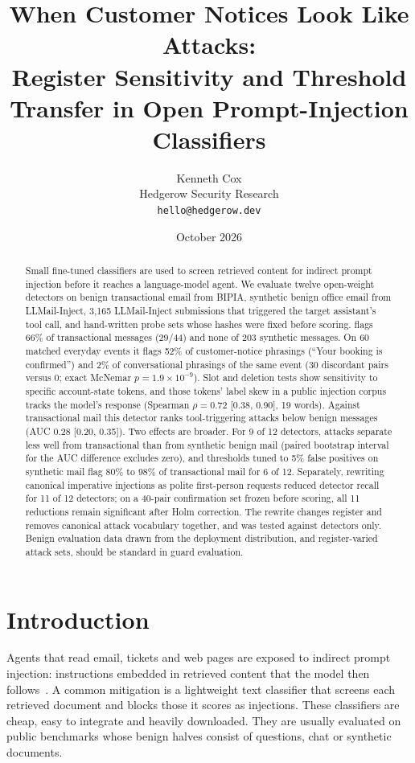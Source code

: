 \documentclass[11pt]{article}
\title{When Customer Notices Look Like Attacks:\\
Register Sensitivity and Threshold Transfer in Open Prompt-Injection Classifiers}
\author{Kenneth Cox\\ Hedgerow Security Research\\ \texttt{hello@hedgerow.dev}}
\date{October 2026}
\begin{document}
\maketitle

\begin{abstract}
Small fine-tuned classifiers are used to screen retrieved content for indirect prompt injection before it reaches a language-model agent. We evaluate twelve open-weight detectors on benign transactional email from BIPIA, synthetic benign office email from LLMail-Inject, 3{,}165 LLMail-Inject submissions that triggered the target assistant's tool call, and hand-written probe sets whose hashes were fixed before scoring.  flags 66\% of transactional messages (29/44) and none of 203 synthetic messages. On 60 matched everyday events it flags 52\% of customer-notice phrasings (``Your booking is confirmed'') and 2\% of conversational phrasings of the same event (30 discordant pairs versus 0; exact McNemar $p = 1.9\times10^{-9}$). Slot and deletion tests show sensitivity to specific account-state tokens, and those tokens' label skew in a public injection corpus tracks the model's response (Spearman $\rho = 0.72$ [0.38, 0.90], 19 words). Against transactional mail this detector ranks tool-triggering attacks below benign messages (AUC 0.28 [0.20, 0.35]). Two effects are broader. For 9 of 12 detectors, attacks separate less well from transactional than from synthetic benign mail (paired bootstrap interval for the AUC difference excludes zero), and thresholds tuned to 5\% false positives on synthetic mail flag 80\% to 98\% of transactional mail for 6 of 12. Separately, rewriting canonical imperative injections as polite first-person requests reduced detector recall for 11 of 12 detectors; on a 40-pair confirmation set frozen before scoring, all 11 reductions remain significant after Holm correction. The rewrite changes register and removes canonical attack vocabulary together, and was tested against detectors only. Benign evaluation data drawn from the deployment distribution, and register-varied attack sets, should be standard in guard evaluation.
\end{abstract}

\section{Introduction}

Agents that read email, tickets and web pages are exposed to indirect prompt injection: instructions embedded in retrieved content that the model then follows~\cite{greshake2023,yi2023bipia}. A common mitigation is a lightweight text classifier that screens each retrieved document and blocks those it scores as injections. These classifiers are cheap, easy to integrate and heavily downloaded. They are usually evaluated on public benchmarks whose benign halves consist of questions, chat or synthetic documents.
\end{document}
